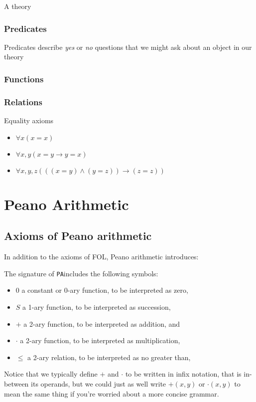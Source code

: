 \documentclass[12pt]{article}
\newcommand{\PA}{\texttt{PA}}
\begin{document}
	A theory
	
	\subsubsection{Predicates}
	
	Predicates describe \emph{yes} or \emph{no} questions that we might ask about an object in our theory
	
	\subsubsection{Functions}	
	\subsubsection{Relations}
	
	Equality axioms
	
	\begin{itemize}
		\item $\forall x (x = x)$
		\item $\forall x, y (x=y \to y=x)$
		\item $\forall x, y, z (((x=y) \land (y=z)) \to (z=z))$
	\end{itemize}
	
	\section{Peano Arithmetic}
	
	\subsection{Axioms of Peano arithmetic}
	In addition to the axioms of FOL, Peano arithmetic introduces:
	
	The signature of \PA includes the following symbols:
	\begin{itemize}
		\item $0$ a constant or 0-ary function, to be interpreted as zero,
		\item $S$ a 1-ary function, to be interpreted as succession,
		\item $+$ a 2-ary function, to be interpreted as addition, and
		\item $\cdot$ a 2-ary function, to be interpreted as multiplication,
		\item $\le$ a 2-ary relation, to be interpreted as no greater than,
	\end{itemize}
	
	Notice that we typically define $+$ and $\cdot$ to be written in infix notation, that is in-between its operands, but we could just as well write $+(x, y)$ or $\cdot(x, y)$ to mean the same thing if you're worried about a more concise grammar.
	
\end{document}
